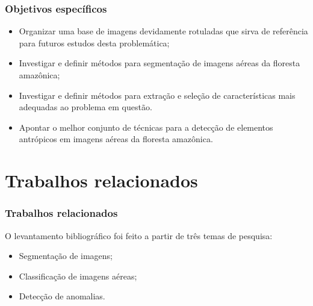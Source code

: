 \documentclass[t]{beamer}
\begin{document}
\begin{frame}[c]
\frametitle{Objetivos específicos}

\begin{itemize}
    \item Organizar uma base de imagens devidamente rotuladas que sirva de referência para futuros estudos desta problemática;
    \item Investigar e definir métodos para segmentação de imagens aéreas da floresta amazônica;
    \item Investigar e definir métodos para extração e seleção de características mais adequadas ao problema em questão.
    \item Apontar o melhor conjunto de técnicas para a detecção de elementos antrópicos em imagens aéreas da floresta amazônica.
\end{itemize}

\end{frame}


\section{Trabalhos relacionados}

\begin{frame}[c]
	\frametitle{Trabalhos relacionados}

	O levantamento bibliográfico foi feito a partir de três temas de pesquisa:
	\vspace{0.5cm}
	\begin{itemize}
		\item Segmentação de imagens;
		\item Classificação de imagens aéreas;
		\item Detecção de anomalias.
	\end{itemize}
\end{frame}
\end{document}
